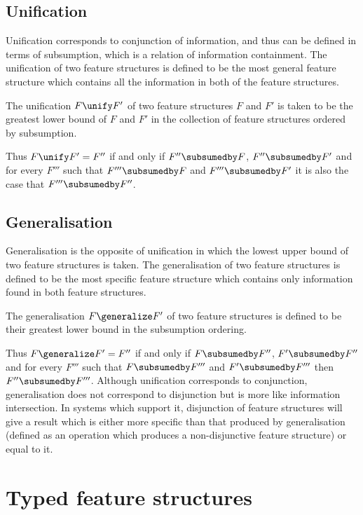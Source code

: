 \documentclass[12pt]{report}
\begin{document}
\subsection{Unification}
\label{untunif}

Unification corresponds to conjunction of information, and thus
can be defined in terms of subsumption, which is a relation of
information containment.  The unification of two feature structures is
defined to be the most general feature structure which contains all
the information in both of the feature structures.  
%
\begin{definition}[Unification]
The unification $F \unify F'$ of two feature structures $F$ and $F'$ is
taken to be the greatest lower bound of $F$ and $F'$ in the collection of
feature structures ordered by subsumption.  
\end{definition}
%
Thus $F \unify F' = F''$ if and only if
$F'' \subsumedby F$, $F'' \subsumedby F'$ and for every $F'''$ such
that $F''' \subsumedby F$ and $F''' \subsumedby F'$ it 
is also the case that $F'''
\subsumedby F''$.  

\subsection{Generalisation}
\label{untgen}

Generalisation is the opposite of unification in which the
lowest upper bound of two feature structures is taken.
The generalisation of two feature structures is defined
to be the most specific feature structure which contains only
information found in both feature structures.
%
\begin{definition}[Generalisation]
The generalisation $F \generalize F'$ of two feature structures is
defined to be their greatest lower bound in the subsumption ordering. 
\end{definition}
Thus $F \generalize F' = F''$ if and only if
$F \subsumedby F''$, $F' \subsumedby F''$ and for every $F'''$ such
that $F \subsumedby F'''$ and $F' \subsumedby F'''$ then $F''
\subsumedby F'''$.
Although unification corresponds to
conjunction, generalisation does not correspond to disjunction 
but is more like information
intersection.  In systems which support it,
disjunction of feature structures will give 
a result which is either more specific than that produced by
generalisation (defined as an operation which produces a non-disjunctive
feature structure)
or equal to it.

\section{Typed feature structures}
\label{types}
\end{document}
